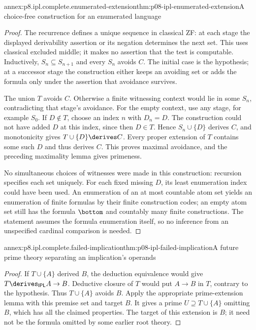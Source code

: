 \begin{annexitem}{annex:p8.ipl.complete.enumerated-extension}{thm:p08-ipl-enumerated-extension}{A choice-free construction for an enumerated language}
\begin{proof}
The recurrence defines a unique sequence in classical ZF: at each stage
the displayed derivability assertion or its negation determines the
next set. This uses classical excluded middle; it makes no assertion
that the test is computable. Inductively, \(S_n\subseteq S_{n+1}\)
and every \(S_n\) avoids \(C\). The initial case is the hypothesis;
at a successor stage the construction either keeps an avoiding set or
adds the formula only under the assertion that avoidance survives.

The union \(T\) avoids \(C\). Otherwise a finite witnessing context
would lie in some \(S_n\), contradicting that stage's avoidance.
For the empty context, use any stage, for example \(S_0\).
If \(D\notin T\), choose an index \(n\) with \(D_n=D\).
The construction could not have added \(D\) at this index, since
then \(D\in T\). Hence \(S_n\cup\{D\}\) derives \(C\),
and monotonicity gives \(T\cup\{D\}\derives C\).
Every proper extension of \(T\) contains some such \(D\) and thus
derives \(C\). This proves maximal avoidance, and the preceding
maximality lemma gives primeness.

No simultaneous choices of witnesses were made in this construction:
recursion specifies each set uniquely. For each fixed missing \(D\),
its least enumeration index could have been used. An enumeration of an
at most countable atom set yields an enumeration of finite formulas by
their finite construction codes; an empty atom set still has the formula
\(\bottom\) and countably many finite constructions. The statement
assumes the formula enumeration itself, so no inference from an
unspecified cardinal comparison is needed.
\end{proof}
\end{annexitem}

\begin{annexitem}{annex:p8.ipl.complete.failed-implication}{thm:p08-ipl-failed-implication}{A future prime theory separating an implication's operands}
\begin{proof}
If \(T\cup\{A\}\) derived \(B\), the deduction equivalence would
give \(T\derives_{\mathsf{IPL}}A\to B\). Deductive closure of
\(T\) would put \(A\to B\) in \(T\), contrary to the hypothesis.
Thus \(T\cup\{A\}\) avoids \(B\). Apply the appropriate
prime-extension lemma with this premise set and target \(B\).
It gives a prime \(U\supseteq T\cup\{A\}\) omitting \(B\),
which has all the claimed properties. The target of this extension is
\(B\); it need not be the formula omitted by some earlier root theory.
\end{proof}
\end{annexitem}

